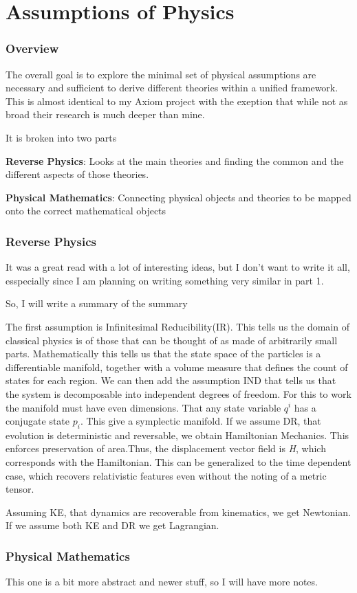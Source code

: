 \chapter{Assumptions of Physics}

\subsection{Overview}
The overall goal is to explore the minimal set of physical assumptions are necessary and sufficient to derive different theories within a
unified framework. This is almost identical to my Axiom project with the exeption that while not as broad their research is much deeper than mine.

It is broken into two parts

\textbf{Reverse Physics}: Looks at the main theories and finding the common and the different aspects of those theories.

\textbf{Physical Mathematics}: Connecting physical objects and theories to be mapped onto the correct mathematical objects



\subsection{Reverse Physics}

It was a great read with a lot of interesting ideas, but I don't want to write it all, esspecially since I am planning on writing something very
similar in part 1.

So, I will write a summary of the summary

The first assumption is Infinitesimal Reducibility(IR). This tells us the domain of classical physics is of those that can be thought of as made of
arbitrarily small parts. Mathematically this tells us that the state space of the particles is a differentiable manifold, together with a volume measure
that defines the count of states for each region. We can then add the assumption IND that tells us that the system is decomposable into independent
degrees of freedom. For this to work the manifold must have even dimensions. That any state variable $q^i$ has a conjugate state $p_i$. This give
a symplectic manifold. If we assume DR, that evolution is deterministic and reversable, we obtain Hamiltonian Mechanics. This enforces preservation of
area.Thus, the displacement vector field is \emph{H}, which corresponds with the Hamiltonian. This can be generalized to the time dependent case, which
recovers relativistic features even without the noting of a metric tensor.

Assuming KE, that dynamics are recoverable from kinematics, we get Newtonian. If we assume both KE and DR we get Lagrangian.

\subsection{Physical Mathematics}
This one is a bit more abstract and newer stuff, so I will have more notes.
